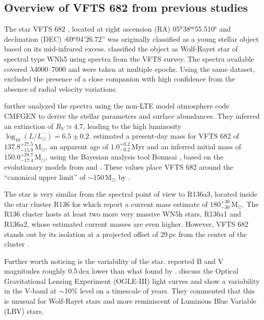 \documentclass[apjl,twocolumn]{emulateapj}
\newcommand{\Msun}{{\,\mathrm{M}_\odot}}
\begin{document}
\subsection{ Overview of VFTS 682 from previous studies \label{data:vfts683}}

The star VFTS 682  \citep{evans:11}, located at right ascension (RA)
05$^\mathrm{h}$38$^\mathrm{m}$55.510$^\mathrm{s}$  and declination
(DEC) \mbox{-69$^\mathrm{o}$04'26.72''} \citep[][]{evans:11}
was originally classified as a young stellar object \citep{gruendl:09}
based on its mid-infrared excess. \citet{evans:11} classified the
object as Wolf-Rayet star of spectral type WNh5 using spectra from the
VFTS survey. The spectra available covered $\lambda$4000--7000 and
were taken at multiple epochs. Using the same dataset,
\citet{bestenlehner:11} excluded the presence of a close companion
with high confidence from the absence of radial velocity variations.

\citet{bestenlehner:11} further analyzed the spectra using the non-LTE
model atmosphere code CMFGEN \citep{hillier:98} to derive the stellar
parameters and surface abundances. They inferred an extinction
of $R_V\simeq4.7$, leading to the high luminosity
$\log_{10}(L/L_\odot) =  6.5\pm0.2$. \citet{schneider:18} estimated
a present-day mass for VFTS 682 of $137.8^{+27.5}_ {-15.9}\Msun$, an
apparent age of $1.0^{+0.2}_{-0.2}$\,Myr and an inferred initial mass
of $150.0^{+28.7}_{-17.4}\Msun$, using the Bayesian analysis tool Bonnsai
\citep{schneider:17}, based on the evolutionary models from
\citet{brott:11} and \cite{kohler:15}. These values place VFTS 682 around the
``canonical upper limit'' of $\sim$$150\Msun$ by \citet{figer:05}.

The star is very similar from the spectral point of view to R136a3, located inside the star cluster
R136 \citep{crowther:10}  for which \citet{crowther:16} report a
current mass estimate of $180^{+30}_{-30}\Msun$. The R136 cluster hosts
at least two more very massive WN5h stars, R136a1 and R136a2, whose
estimated current masses are even higher. However, VFTS 682 stands
out by its isolation at a projected offset of 29\,pc from the center
of the cluster \citep{bestenlehner:11}. 

Further worth noticing is the variability of the
star. \citet{parker:93} reported B and V magnitudes roughly 0.5\,dex
lower than what found by \citet{evans:11}. \citet{bestenlehner:11} discuss the Optical Gravitational Lensing
Experiment (OGLE-III) light curves \citep{udalski:08} and show a
variability in the V-band at $\sim$10\% level on a timescale of years.
They commented that this is unusual for Wolf-Rayet stars and more reminiscent
of Luminous Blue Variable (LBV) stars. 
\end{document}
